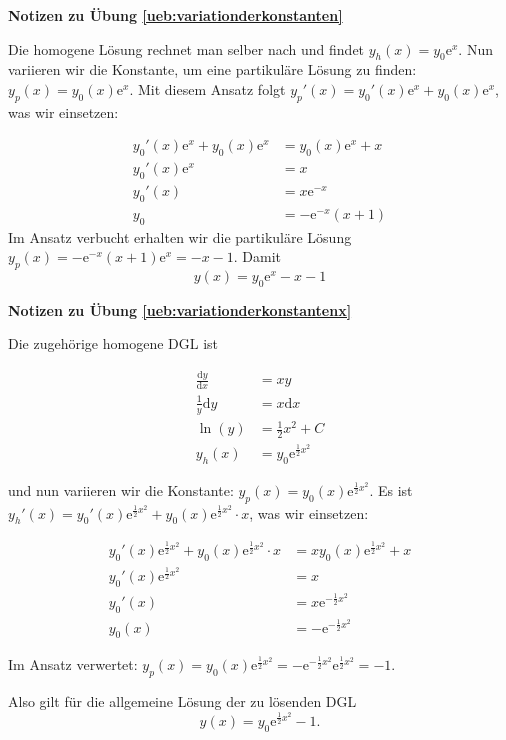 \documentclass[%
11pt,%
twoside,%
titlepage,%
swissgerman,%
headsepline%
]{scrartcl}
\newcommand{\faReturnGray}{\textcolor{gray}{\faMailReply}} %
\theoremstyle{definition}
\theoremstyle{plain}
\newcommand{\concatueb}[1]{ueb:#1}%
\newcommand{\concatlsg}[1]{lsg:#1}%
\newenvironment{lsg}[1]{%
    \par\noindent\textbf{Notizen zu Übung \ref{\concatueb{#1}}}\label{\concatlsg{#1}}
    \hfill\hyperref[\concatueb{#1}]{\faReturnGray}\par %
}{%
    \par%
}
\begin{document}
\begin{lsg}{variationderkonstanten}
    Die homogene Lösung rechnet man selber nach und findet $y_h(x)=y_0\mathrm{e}^{x}$. Nun variieren wir die Konstante, um eine partikuläre Lösung zu finden: $y_p(x)=y_0(x)\mathrm{e}^{x}$. Mit diesem Ansatz folgt $y_p'(x)=y_0'(x)\mathrm{e}^{x}+y_0(x)\mathrm{e}^{x}$, was wir einsetzen:

    \begin{align*}
        y_0'(x)\mathrm{e}^{x}+y_0(x)\mathrm{e}^{x} &= y_0(x)\mathrm{e}^{x} + x\\
        y_0'(x)\mathrm{e}^{x} &= x\\
        y_0'(x) &= x\mathrm{e}^{-x}\\
        y_0 &= -\mathrm{e}^{-x}(x+1)
    \end{align*}
    Im Ansatz verbucht erhalten wir die partikuläre Lösung $y_p(x)=-\mathrm{e}^{-x}(x+1)\mathrm{e}^{x}=-x-1$. Damit
    $$y(x)=y_0\mathrm{e}^{x}-x-1$$
\end{lsg}
\begin{lsg}{variationderkonstantenx}
Die zugehörige homogene DGL ist

\begin{align*}
    \frac{\mathrm{d}y}{\mathrm{d}x} &= xy\\
    \frac{1}{y}\mathrm{d}y &= x\mathrm{d}x\\
    \ln(y) &= \frac{1}{2}x^2+C\\
    y_h(x) &= y_0\mathrm{e}^{\frac{1}{2}x^2}
\end{align*}

und nun variieren wir die Konstante: $y_p(x) = y_0(x)\mathrm{e}^{\frac{1}{2}x^2}$. Es ist $y_h'(x) = y_0'(x)\mathrm{e}^{\frac{1}{2}x^2}+y_0(x)\mathrm{e}^{\frac{1}{2}x^2}\cdot x$, was wir einsetzen:

\begin{align*}
    y_0'(x)\mathrm{e}^{\frac{1}{2}x^2}+y_0(x)\mathrm{e}^{\frac{1}{2}x^2}\cdot x &= xy_0(x)\mathrm{e}^{\frac{1}{2}x^2}+x\\
    y_0'(x)\mathrm{e}^{\frac{1}{2}x^2} &= x\\
    y_0'(x) &= x\mathrm{e}^{-\frac{1}{2}x^2}\\
    y_0(x) &= -\mathrm{e}^{-\frac{1}{2}x^2}
\end{align*}

Im Ansatz verwertet: $y_p(x) = y_0(x)\mathrm{e}^{\frac{1}{2}x^2} = -\mathrm{e}^{-\frac{1}{2}x^2}\mathrm{e}^{\frac{1}{2}x^2}=-1$.

Also gilt für die allgemeine Lösung der zu lösenden DGL
$$y(x) = y_0\mathrm{e}^{\frac{1}{2}x^2} - 1.$$
\end{lsg}
\end{document}
